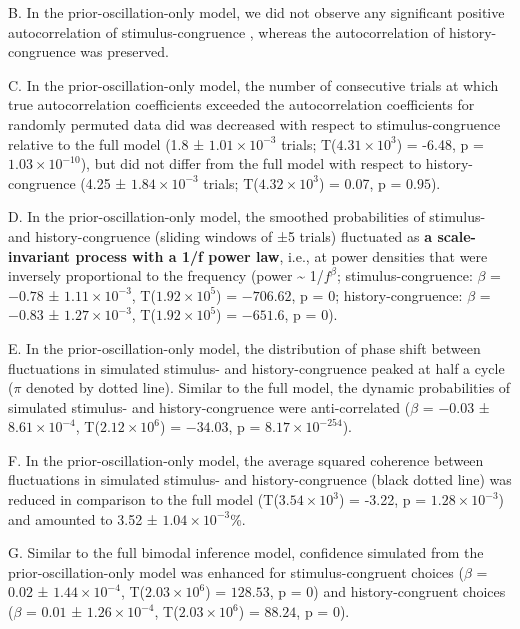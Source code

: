 \documentclass[
]{article}
\begin{document}
B. In the prior-oscillation-only model, we did not observe any
significant positive autocorrelation of stimulus-congruence , whereas
the autocorrelation of history-congruence was preserved.

C. In the prior-oscillation-only model, the number of consecutive trials
at which true autocorrelation coefficients exceeded the autocorrelation
coefficients for randomly permuted data did was decreased with respect
to stimulus-congruence relative to the full model (1.8 ±
\ensuremath{1.01\times 10^{-3}} trials;
T(\ensuremath{4.31\times 10^{3}}) = -6.48, p =
\(\ensuremath{1.03\times 10^{-10}}\)), but did not differ from the full
model with respect to history-congruence (4.25 ±
\ensuremath{1.84\times 10^{-3}} trials;
T(\ensuremath{4.32\times 10^{3}}) = 0.07, p = \(0.95\)).

D. In the prior-oscillation-only model, the smoothed probabilities of
stimulus- and history-congruence (sliding windows of ±5 trials)
fluctuated as \textbf{a scale-invariant process with a 1/f power law},
i.e., at power densities that were inversely proportional to the
frequency (power \textasciitilde{} 1/\(f^\beta\); stimulus-congruence:
\(\beta\) = \(-0.78\) ± \(\ensuremath{1.11\times 10^{-3}}\),
T(\(\ensuremath{1.92\times 10^{5}}\)) = \(-706.62\), p = \(0\);
history-congruence: \(\beta\) = \(-0.83\) ±
\(\ensuremath{1.27\times 10^{-3}}\),
T(\(\ensuremath{1.92\times 10^{5}}\)) = \(-651.6\), p = \(0\)).

E. In the prior-oscillation-only model, the distribution of phase shift
between fluctuations in simulated stimulus- and history-congruence
peaked at half a cycle (\(\pi\) denoted by dotted line). Similar to the
full model, the dynamic probabilities of simulated stimulus- and
history-congruence were anti-correlated (\(\beta\) = \(-0.03\) ±
\(\ensuremath{8.61\times 10^{-4}}\),
T(\(\ensuremath{2.12\times 10^{6}}\)) = \(-34.03\), p =
\(\ensuremath{8.17\times 10^{-254}}\)).

F. In the prior-oscillation-only model, the average squared coherence
between fluctuations in simulated stimulus- and history-congruence
(black dotted line) was reduced in comparison to the full model
(T(\ensuremath{3.54\times 10^{3}}) = -3.22, p =
\(\ensuremath{1.28\times 10^{-3}}\)) and amounted to 3.52 ±
\ensuremath{1.04\times 10^{-3}}\%.

G. Similar to the full bimodal inference model, confidence simulated
from the prior-oscillation-only model was enhanced for
stimulus-congruent choices (\(\beta\) = \(0.02\) ±
\(\ensuremath{1.44\times 10^{-4}}\),
T(\(\ensuremath{2.03\times 10^{6}}\)) = \(128.53\), p = \(0\)) and
history-congruent choices (\(\beta\) = \(0.01\) ±
\(\ensuremath{1.26\times 10^{-4}}\),
T(\(\ensuremath{2.03\times 10^{6}}\)) = \(88.24\), p = \(0\)).
\end{document}
